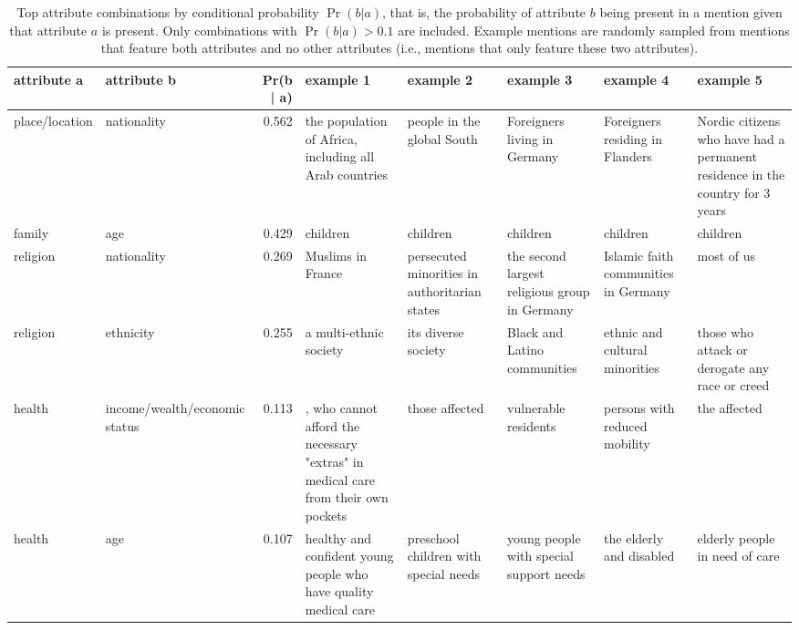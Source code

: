 \begin{table}[!th]
\centering
\caption{Top attribute combinations by conditional probability $\Pr(b | a)$, that is, the probability of attribute $b$ being present in a mention given that attribute $a$ is present. Only combinations with $\Pr(b | a) > 0.1$ are included. Example mentions are randomly sampled from mentions that feature both attributes and no other attributes (i.e., mentions that only feature these two attributes).}
\label{tableD01}
\begin{tabular}{p{3cm} L{3cm} r L{2.5cm} L{2.5cm} L{2.5cm} L{2.5cm} L{2.5cm}}
\toprule
attribute a & attribute b & Pr(b | a) & example 1 & example 2 & example 3 & example 4 & example 5 \\
\midrule
place/location & nationality & 0.562 & the population of Africa, including all Arab countries & people in the global South & Foreigners living in Germany & Foreigners residing in Flanders & Nordic citizens who have had a permanent residence in the country for 3 years \\
family & age & 0.429 & children & children & children & children & children \\
religion & nationality & 0.269 & Muslims in France & persecuted minorities in authoritarian states & the second largest religious group in Germany & Islamic faith communities in Germany & most of us \\
religion & ethnicity & 0.255 & a multi-ethnic society & its diverse society & Black and Latino communities & ethnic and cultural minorities & those who attack or derogate any race or creed \\
health & income/wealth/economic status & 0.113 & , who cannot afford the necessary "extras" in medical care from their own pockets & those affected & vulnerable residents & persons with reduced mobility & the affected \\
health & age & 0.107 & healthy and confident young people who have quality medical care & preschool children with special needs & young people with special support needs & the elderly and disabled & elderly people in need of care \\
\bottomrule
\end{tabular}
\end{table}
